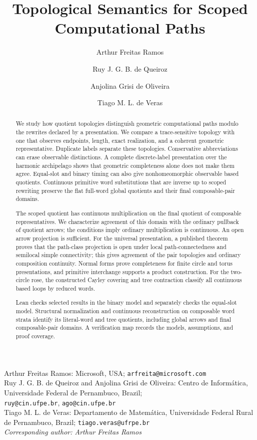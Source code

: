 \documentclass[10pt,reqno]{amsart}
\title[Topological Semantics for Scoped Computational Paths]
  {Topological Semantics for Scoped Computational Paths}
\author{Arthur Freitas Ramos}
\author{Ruy J. G. B. de Queiroz}
\author{Anjolina Grisi de Oliveira}
\author{Tiago M. L. de Veras}
\theoremstyle{definition}
\theoremstyle{plain}
\theoremstyle{remark}
\begin{document}
\raggedbottom

\begin{abstract}
We study how quotient topologies distinguish geometric computational paths
modulo the rewrites declared by a presentation. We compare a
trace-sensitive topology with one that observes
endpoints, length, exact realization, and a coherent geometric representative.
Duplicate labels separate these topologies. Conservative abbreviations can
erase observable distinctions. A complete discrete-label
presentation over the harmonic archipelago shows that geometric completeness
alone does not make them agree. Equal-slot and binary timing can also give
nonhomeomorphic observable based quotients. Continuous primitive word substitutions that
are inverse up to scoped rewriting preserve the flat full-word global
quotients and their final composable-pair domains.

The scoped quotient has continuous multiplication on the final quotient of
composable representatives. We characterize agreement of this domain with
the ordinary pullback of quotient arrows; the conditions imply ordinary
multiplication is continuous. An open arrow projection is sufficient.
For the universal presentation, a published theorem proves that the path-class
projection is open under local path-connectedness and semilocal simple
connectivity; this gives agreement of the pair topologies and ordinary
composition continuity.
Normal forms prove completeness for finite circle and torus presentations,
and primitive interchange supports a product construction. For the two-circle rose, the constructed Cayley covering and tree contraction
classify all continuous based loops by reduced words.

Lean checks selected results in the binary model and separately checks the
equal-slot model. Structural normalization and continuous reconstruction on
composable word strata identify its literal-word and tree quotients, including
global arrows and final composable-pair domains. A verification map records
the models, assumptions, and proof coverage.

\end{abstract}

\maketitle

\begin{center}
\footnotesize
Arthur Freitas Ramos: Microsoft, USA; \texttt{arfreita@microsoft.com}\\
Ruy J. G. B. de Queiroz and Anjolina Grisi de Oliveira: Centro de
Inform\'atica, Universidade Federal de Pernambuco, Brazil;\\
\texttt{ruy@cin.ufpe.br}, \texttt{ago@cin.ufpe.br}\\
Tiago M. L. de Veras: Departamento de Matem\'atica, Universidade Federal
Rural de Pernambuco, Brazil; \texttt{tiago.veras@ufrpe.br}\\[2pt]
\emph{Corresponding author: Arthur Freitas Ramos}
\end{center}
\enlargethispage{7pt}
\end{document}
